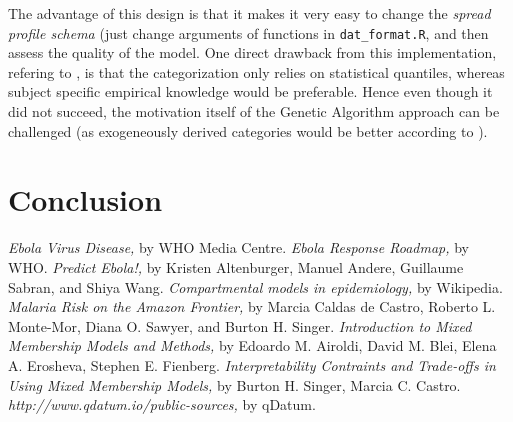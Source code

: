 \documentclass[twoside]{article}
\begin{document}
The advantage of this design is that it makes it very easy to change the \textit{spread profile schema} (just change arguments of functions in \texttt{dat\_format.R}, and then assess the quality of the model. One direct drawback from this implementation, refering to \cite{mixmemint}, is that the categorization only relies on statistical quantiles, whereas subject specific empirical knowledge would be preferable. Hence even though it did not succeed, the motivation itself of the Genetic Algorithm approach can be challenged (as exogeneously derived categories would be better according to \cite{mixmemint}).


\section{Conclusion}



\clearpage
\begin{thebibliography}{9}
 \emph{Ebola Virus Disease,}
 by WHO Media Centre. 
 \emph{Ebola Response Roadmap,} by 
	 WHO.
 \emph{Predict Ebola!,} by 
	 Kristen Altenburger, Manuel Andere, Guillaume Sabran, and Shiya Wang.
 \emph{Compartmental models in epidemiology,} by 
	 Wikipedia. 
	\emph{Malaria Risk on the Amazon Frontier,} by Marcia Caldas de Castro, Roberto L. Monte-Mor, Diana O. Sawyer, and Burton H. Singer.
  \emph{Introduction to Mixed Membership Models and Methods,} by Edoardo M. Airoldi, David M. Blei, Elena A. Erosheva, Stephen E. Fienberg.
  \emph{Interpretability Contraints and Trade-offs in Using Mixed Membership Models,} by Burton H. Singer, Marcia C. Castro.
  \emph{http://www.qdatum.io/public-sources,} by qDatum.

\end{thebibliography}
\end{document}
